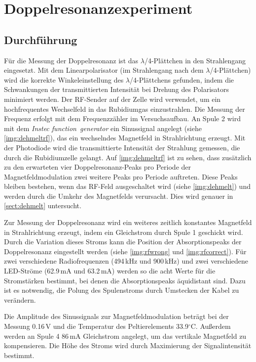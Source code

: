 \section{Doppelresonanzexperiment}
\subsection{Durchführung}
Für die Messung der Doppelresonanz ist das $\lambda$/4-Plättchen in den Strahlengang eingesetzt.
Mit dem Linearpolarisator (im Strahlengang nach dem $\lambda$/4-Plättchen) wird die
korrekte Win\-kel\-ein\-stel\-lung des $\lambda$/4-Plättchens gefunden,
indem die Schwankungen der transmittierten Intensität
bei Drehung des Polarisators minimiert werden.
Der RF-Sender auf der Zelle wird verwendet, um ein hochfrequentes Wechselfeld in das Rubidiumgas einzustrahlen.
Die Messung der Frequenz erfolgt mit dem Frequenzzähler im Versuchsaufbau.
An Spule 2 wird mit dem \emph{Instec function~generator} ein Sinussignal angelegt (siehe \autoref{img:dehmeltrf}),
das ein wechselndes Magnetfeld in Strahlrichtung erzeugt.
Mit der Photodiode wird die transmittierte Intensität der Strahlung gemessen,
die durch die Rubidiumzelle gelangt.
Auf \autoref{img:dehmeltrf} ist zu sehen, dass zusätzlich zu den erwarteten vier Doppelresonanz-Peaks pro
Periode der Magnetfeldmodulation zwei weitere Peaks pro Periode auftreten.
Diese Peaks bleiben bestehen, wenn das RF-Feld ausgeschaltet wird (siehe \autoref{img:dehmelt}) und
werden durch die Umkehr des Magnetfelds verursacht. Dies wird genauer in \autoref{sect:dehmelt} untersucht.

Zur Messung der Doppelresonanz wird ein weiteres zeitlich konstantes Magnetfeld in Strahlrichtung erzeugt,
indem ein Gleichstrom durch Spule 1 geschickt wird.
Durch die Variation dieses Stroms kann die Position der Absorptionspeaks der Doppelresonanz eingestellt werden
(siehe \autoref{img:rfwrong} und \autoref{img:rfcorrect}).
Für zwei verschiedene Radiofrequenzen (494\,kHz und 900\,kHz) und
zwei verschiedene LED-Ströme (62.9\,mA und 63.2\,mA) werden so die acht 
Werte für die Stromstärken bestimmt, bei denen die Absorptionspeaks äquidistant sind.
Dazu ist es notwendig, die Polung des Spulenstroms durch Umstecken der Kabel zu verändern.

Die Amplitude des Sinussignals zur Magnetfeldmodulation beträgt bei der Messung 0.16\,V und
die Temperatur des Peltierelements 33.9$^\circ$C.
Außerdem werden an Spule 4 86\,mA Gleichstrom angelegt, um das vertikale Magnetfeld zu kompensieren.
Die Höhe des Stroms wird durch Maximierung der Signalintensität bestimmt.




